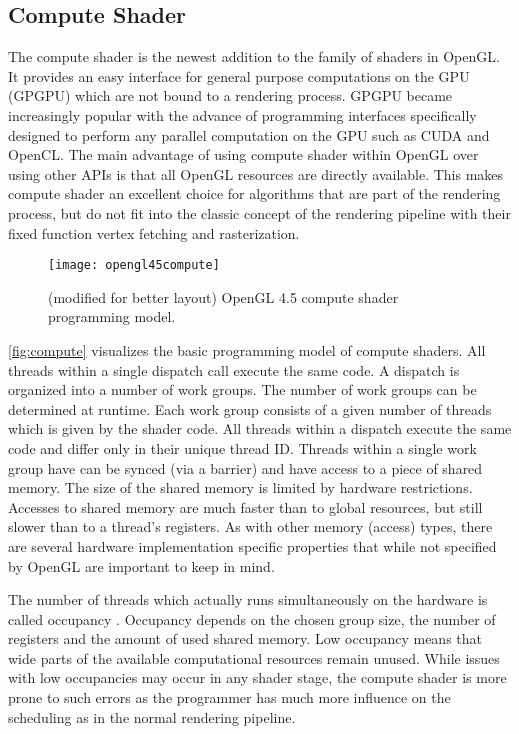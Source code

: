\documentclass[thesis.tex]{subfiles}
\begin{document}
\subsection{Compute Shader} \label{sec:preq:compute}
The compute shader is the newest addition to the family of shaders in OpenGL.
It provides an easy interface for general purpose computations on the GPU (GPGPU) which are not bound to a rendering process.
GPGPU became increasingly popular with the advance of programming interfaces specifically designed to perform any parallel computation on the GPU such as CUDA and OpenCL.
The main advantage of using compute shader within OpenGL over using other APIs is that all OpenGL resources are directly available.
This makes compute shader an excellent choice for algorithms that are part of the rendering process, but do not fit into the classic concept of the rendering pipeline with their fixed function vertex fetching and rasterization.

\begin{figure}[h]
\centering
\texttt{[image: opengl45compute]}
\caption{\cite{bib:openglquickref} (modified for better layout) OpenGL 4.5 compute shader programming model.}
\label{fig:compute}
\end{figure}
\autoref{fig:compute} visualizes the basic programming model of compute shaders.
All threads within a single dispatch call execute the same code.
A dispatch is organized into a number of work groups. 
The number of work groups can be determined at runtime. 
Each work group consists of a given number of threads which is given by the shader code.
All threads within a dispatch execute the same code and differ only in their unique thread ID.
Threads within a single work group have can be synced (via a barrier) and have access to a piece of shared memory.
The size of the shared memory is limited by hardware restrictions. 
Accesses to shared memory are much faster than to global resources, but still slower than to a thread's registers.
As with other memory (access) types, there are several hardware implementation specific properties that while not specified by OpenGL are important to keep in mind. 

The number of threads which actually runs simultaneously on the hardware is called occupancy \cite{bib:cudaprogguide, bib:amdoccupancy}.
Occupancy depends on the chosen group size, the number of registers and the amount of used shared memory.
Low occupancy means that wide parts of the available computational resources remain unused.
While issues with low occupancies may occur in any shader stage, the compute shader is more prone to such errors as the programmer has much more influence on the scheduling as in the normal rendering pipeline.
\end{document}
